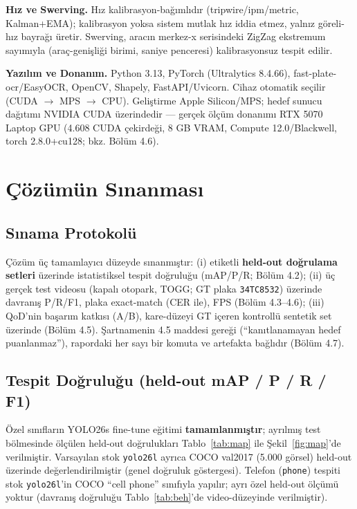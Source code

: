 \documentclass[12pt,a4paper]{article}
\newcommand{\tcode}[1]{\texttt{\small #1}}
\begin{document}
\textbf{Hız ve Swerving.} Hız kalibrasyon-bağımlıdır (tripwire/ipm/metric, Kalman+EMA); kalibrasyon
yoksa sistem mutlak hız iddia etmez, yalnız göreli-hız bayrağı üretir. Swerving, aracın merkez-x
serisindeki ZigZag ekstremum sayımıyla (araç-genişliği birimi, saniye penceresi) kalibrasyonsuz tespit
edilir.

\textbf{Yazılım ve Donanım.} Python 3.13, PyTorch (Ultralytics 8.4.66), fast-plate-ocr/EasyOCR,
OpenCV, Shapely, FastAPI/Uvicorn. Cihaz otomatik seçilir (CUDA $\rightarrow$ MPS $\rightarrow$ CPU).
Geliştirme Apple Silicon/MPS; hedef sunucu dağıtımı NVIDIA CUDA üzerindedir — gerçek ölçüm donanımı
RTX 5070 Laptop GPU (4.608 CUDA çekirdeği, 8 GB VRAM, Compute 12.0/Blackwell, torch 2.8.0+cu128;
bkz. Bölüm 4.6).

\section{Çözümün Sınanması}

\subsection{Sınama Protokolü}
Çözüm üç tamamlayıcı düzeyde sınanmıştır: (i) etiketli \textbf{held-out doğrulama setleri} üzerinde
istatistiksel tespit doğruluğu (mAP/P/R; Bölüm 4.2); (ii) üç gerçek test videosu (kapalı otopark, TOGG;
GT plaka \tcode{34TC8532}) üzerinde davranış P/R/F1, plaka exact-match (CER ile), FPS (Bölüm 4.3--4.6);
(iii) QoD'nin başarım katkısı (A/B), kare-düzeyi GT içeren kontrollü sentetik set üzerinde (Bölüm 4.5).
Şartnamenin 4.5 maddesi gereği (``kanıtlanamayan hedef puanlanmaz''), rapordaki her sayı bir komuta ve
artefakta bağlıdır (Bölüm 4.7).

\subsection{Tespit Doğruluğu (held-out mAP / P / R / F1)}
Özel sınıfların YOLO26s fine-tune eğitimi \textbf{tamamlanmıştır}; ayrılmış test bölmesinde ölçülen
held-out doğrulukları Tablo~\ref{tab:map} ile Şekil~\ref{fig:map}'de verilmiştir.
Varsayılan stok \tcode{yolo26l} ayrıca COCO val2017 (5.000 görsel) held-out üzerinde değerlendirilmiştir
(genel doğruluk göstergesi). Telefon (\tcode{phone}) tespiti stok \tcode{yolo26l}'in COCO ``cell phone''
sınıfıyla yapılır; ayrı özel held-out ölçümü yoktur (davranış doğruluğu Tablo~\ref{tab:beh}'de
video-düzeyinde verilmiştir).
\end{document}
